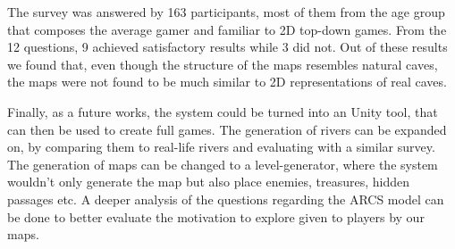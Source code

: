 The survey was answered by 163 participants, most of them from the age group that composes the average gamer and familiar to 2D top-down games. From the 12 questions, 9 achieved satisfactory results while 3 did not. Out of these results we found that, even though the structure of the maps resembles natural caves, the maps were not found to be much similar to 2D representations of real caves.

Finally, as a future works, the system could be turned into an Unity tool, that can then be used to create full games. The generation of rivers can be expanded on, by comparing them to real-life rivers and evaluating with a similar survey. The generation of maps can be changed to a level-generator, where the system wouldn't only generate the map but also place enemies, treasures, hidden passages etc. A deeper analysis of the questions regarding the ARCS model can be done to better evaluate the motivation to explore given to players by our maps.